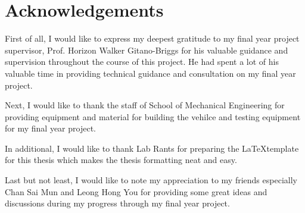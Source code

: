 \chapter{Acknowledgements}

First of all, I would like to express my deepest gratitude to my final year project supervisor, Prof. Horizon Walker Gitano-Briggs for his valuable guidance and supervision throughout the course of this project. He had spent a lot of his valuable time in providing technical guidance and consultation on my final year project.

Next, I would like to thank the staff of School of Mechanical Engineering for providing equipment and material for building the vehilce and testing equipment for my final year project.

In additional, I would like to thank Lab Rants for preparing the \LaTeX template for this thesis which makes the thesis formatting neat and easy.

Last but not least, I would like to note my appreciation to my friends especially Chan Sai Mun and Leong Hong You for providing some great ideas and discussions during my progress through my final year project.
